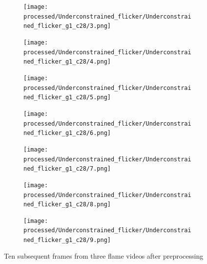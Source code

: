 \documentclass{article}
\begin{document}
\begin{figure}
\begin{subfigure}{0.1\textwidth}
		\texttt{[image: processed/Underconstrained\_flicker/Underconstrained\_flicker\_g1\_c28/3.png]}
	\end{subfigure}
	\begin{subfigure}{0.1\textwidth}
		\texttt{[image: processed/Underconstrained\_flicker/Underconstrained\_flicker\_g1\_c28/4.png]}
	\end{subfigure}
	\begin{subfigure}{0.1\textwidth}
		\texttt{[image: processed/Underconstrained\_flicker/Underconstrained\_flicker\_g1\_c28/5.png]}
	\end{subfigure}
	\begin{subfigure}{0.1\textwidth}
		\texttt{[image: processed/Underconstrained\_flicker/Underconstrained\_flicker\_g1\_c28/6.png]}
	\end{subfigure}
	\begin{subfigure}{0.1\textwidth}
		\texttt{[image: processed/Underconstrained\_flicker/Underconstrained\_flicker\_g1\_c28/7.png]}
	\end{subfigure}
	\begin{subfigure}{0.1\textwidth}
		\texttt{[image: processed/Underconstrained\_flicker/Underconstrained\_flicker\_g1\_c28/8.png]}
	\end{subfigure}
	\begin{subfigure}{0.1\textwidth}
		\texttt{[image: processed/Underconstrained\_flicker/Underconstrained\_flicker\_g1\_c28/9.png]}
	\end{subfigure}

	\caption{Ten subsequent frames from three flame videos after preprocessing}
	\label{fig:flames}
\end{figure}
\end{document}
